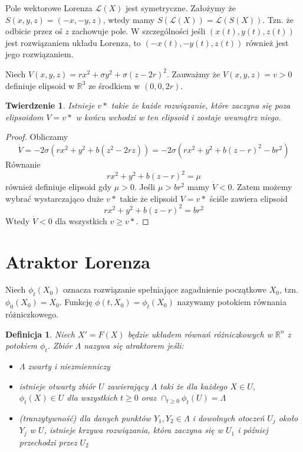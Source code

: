 \documentclass[12pt]{report}
\newtheorem{theorem}{Twierdzenie}
\newtheorem{definition}{Definicja}
\newcommand{\R}{\mathbb{R}}
\begin{document}
	\par Pole wektorowe Lorenza $\mathcal{L}(X)$ jest symetryczne. Założymy że $S(x, y, z) = (-x, -y, z)$, wtedy mamy $S(\mathcal{L}(X)) = \mathcal{L}(S(X))$. Tzn. że odbicie przez oś $z$ zachowuje pole. W szczególności jeśli $(x(t), y(t), z(t))$ jest rozwiązaniem układu Lorenza, to $(-x(t), -y(t), z(t))$ również jest jego rozwiązaniem.
	\\
	\par Niech $V(x, y, z) = rx^2 + \sigma y^2 + \sigma (z - 2r)^2$. Zauważmy że $V(x, y, z) = v > 0$ definiuje elipsoid w $\R^3$ ze środkiem w $(0, 0, 2r)$.
	\begin{theorem}
		Istnieje $v*$ takie że każde rozwiązanie, które zaczyna się poza elipsoidom $V = v*$ w końcu wchodzi w ten elipsoid i zostaje wewnątrz niego.
	\end{theorem}
	\begin{proof}
		Obliczamy
			\[ \dot{V} = -2 \sigma (rx^2 + y^2 + b(z^2 - 2rz)) = -2 \sigma (rx^2 + y^2 + b(z - r)^2 - br^2) \]
		Równanie
			\[ rx^2 + y^2 + b(z - r)^2 = \mu \]
		również definiuje elipsoid gdy $\mu > 0$. Jeśli $\mu > br^2$ mamy $\dot{V} < 0$. Zatem możemy wybrać wystarczająco duże $v*$ takie że elipsoid $V = v*$ ściśle zawiera elipsoid
			\[ rx^2 + y^2 + b(z - r)^2 = br^2 \]
		Wtedy $\dot{V} < 0$ dla wszystkich $v \ge v*$.
	\end{proof}

	\section{Atraktor Lorenza}
	\par Niech $\phi_t (X_0)$ oznacza rozwiązanie spełniające zagadnienie początkowe $X_0$, tzn. $\phi_0 (X_0) = X_0$. Funkcję $\phi(t, X_0) = \phi_t(X_0)$ nazywamy potokiem równania różniczkowego.
	\begin{definition}
		Niech $X' = F(X)$ będzie układem równań różniczkowych w $\R^n$ z potokiem $\phi_t$. Zbiór $\Lambda$ nazywa się atraktorem jeśli:
		\begin{itemize}
			\item $\Lambda$ zwarty i niezmienniczy
			\item istnieje otwarty zbiór $U$ zawierający $\Lambda$ taki że dla każdego $X \in U$, $\phi_t(X) \in U$ dla wszystkich $t \ge 0$ oraz $\cap_{t \ge 0} \phi_t(U) = \Lambda$
			\item (tranzytywność) dla danych punktów $Y_1, Y_2 \in \Lambda$ i dowolnych otoczeń $U_j$ około $Y_j$ w $U$, istnieje krzywa rozwiązania, która zaczyna się w $U_1$ i później przechodzi przez $U_2$
		\end{itemize}
	\end{definition}
\end{document}
